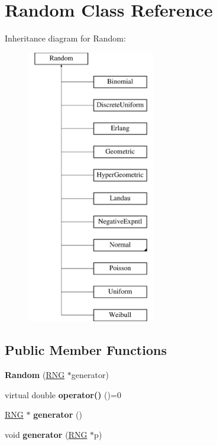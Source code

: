 \hypertarget{classRandom}{}\section{Random Class Reference}
\label{classRandom}
Inheritance diagram for Random\+:\begin{figure}[H]
\begin{center}
\leavevmode
\includegraphics[height=12.000000cm]{classRandom}
\end{center}
\end{figure}
\subsection*{Public Member Functions}
\begin{DoxyCompactItemize}
\item 
\mbox{\label{classRandom_aa8bf3ffac291c5cdedfe912e3161f9cf}} 
{\bfseries Random} (\hyperlink{classRNG}{R\+NG} $\ast$generator)
\item 
\mbox{\label{classRandom_a29bc86657bf0b49ef12c0fc129ab9304}} 
virtual double {\bfseries operator()} ()=0
\item 
\mbox{\label{classRandom_a321b3a2d700a209afd805932d7b78cf8}} 
\hyperlink{classRNG}{R\+NG} $\ast$ {\bfseries generator} ()
\item 
\mbox{\label{classRandom_a0cde83254bfbab13e51f00ec131f5297}} 
void {\bfseries generator} (\hyperlink{classRNG}{R\+NG} $\ast$p)
\end{DoxyCompactItemize}
